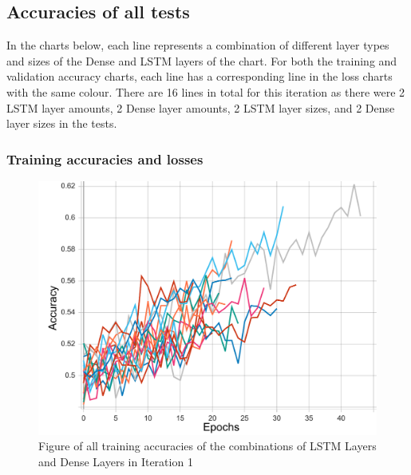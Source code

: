 \subsection{Accuracies of all tests}
In the charts below, each line represents a combination of different layer types and sizes of the Dense and LSTM layers of the chart.
For both the training and validation accuracy charts, each line has a corresponding line in the loss charts with the same colour.
There are 16 lines in total for this iteration as there were 2 LSTM layer amounts, 2 Dense layer amounts,
2 LSTM layer sizes, and 2 Dense layer sizes in the tests.

\subsubsection{Training accuracies and losses}
\begin{figure}[ht]
    \centering
    \includegraphics[width=0.95\columnwidth]{figures/results/lstm/lstm_all_acc_t.pdf}
    \caption[Training accuracies for Iteration 1]{Figure of all training accuracies of the combinations of LSTM Layers and Dense Layers in Iteration 1}
    \label{fig:iteration1_train_accuracy}
\end{figure}
\FloatBarrier

